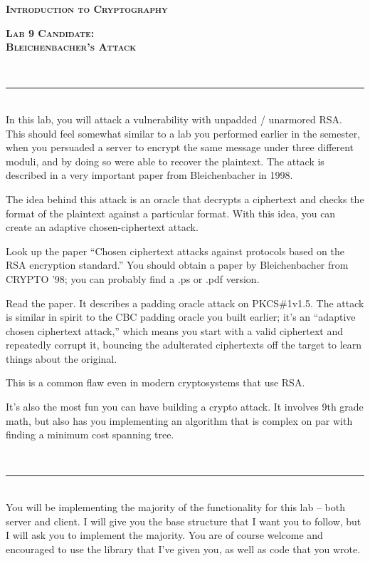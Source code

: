 \documentclass[11pt,oneside]{article}
\newcommand{\class}{Introduction to Cryptography}
\newcommand{\project}{Lab 9 Candidate:\\Bleichenbacher's Attack}
\newcommand{\sectionfont}{phv} %
\newcommand{\bodyfont}{ppl} %
\renewcommand{\section}[1] {
    \vspace{12pt}{\quad\fontfamily{\sectionfont}\selectfont\Large\scshape\textbf{#1}}\\[-10pt]
    \vspace{8pt}\rule{\textwidth}{1pt}\\[-16pt]

}
\begin{document}
\fontfamily{\bodyfont} \selectfont \small
\thispagestyle{empty}
\begin{center}
    \fontfamily{\sectionfont}\selectfont\huge\scshape\textbf{\class}
\end{center}
\begin{center}
    \fontfamily{\sectionfont}\selectfont\large\scshape\textbf{\project}
\end{center}

\section{Overview}

In this lab, you will attack a vulnerability with unpadded / unarmored RSA.
This should feel somewhat similar to a lab you performed earlier in the semester,
when you persuaded a server to encrypt the same message under three different
moduli, and by doing so were able to recover the plaintext. The attack is
described in a very important paper from Bleichenbacher in 1998.

The idea behind this attack is an oracle that decrypts a ciphertext and checks
the format of the plaintext against a particular format. With this idea, you can
create an adaptive chosen-ciphertext attack.

Look up the paper ``Chosen ciphertext attacks against protocols based on the RSA
encryption standard.'' You should obtain a paper by Bleichenbacher from CRYPTO
'98; you can probably find a .ps or .pdf version.

Read the paper. It describes a padding oracle attack on PKCS\#1v1.5. The attack
is similar in spirit to the CBC padding oracle you built earlier; it's an
``adaptive chosen ciphertext attack,'' which means you start with a valid
ciphertext and repeatedly corrupt it, bouncing the adulterated ciphertexts off
the target to learn things about the original.

This is a common flaw even in modern cryptosystems that use RSA.

It's also the most fun you can have building a crypto attack. It involves 9th
grade math, but also has you implementing an algorithm that is complex on par
with finding a minimum cost spanning tree.

\section{Assignment}

You will be implementing the majority of the functionality for this lab -- both
server and client. I will give you the base structure that I want you to follow,
but I will ask you to implement the majority. You are of course welcome and
encouraged to use the library that I've given you, as well as code that you
wrote.
\end{document}
